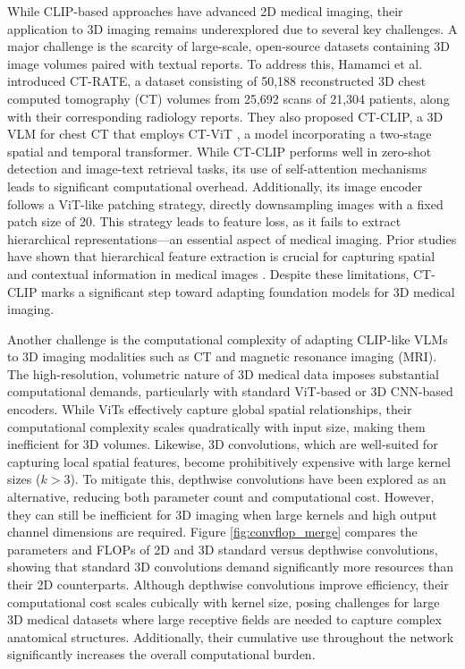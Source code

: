 While CLIP-based approaches have advanced 2D medical imaging, their application to 3D imaging remains underexplored due to several key challenges. A major challenge is the scarcity of large-scale, open-source datasets containing 3D image volumes paired with textual reports. To address this, Hamamci et al. \cite{hamamci2024foundation} introduced CT-RATE, a dataset consisting of 50,188 reconstructed 3D chest computed tomography (CT) volumes from 25,692 scans of 21,304 patients, along with their corresponding radiology reports. They also proposed CT-CLIP, a 3D VLM for chest CT that employs CT-ViT \cite{hamamci2025generatect}, a model incorporating a two-stage spatial and temporal transformer. While CT-CLIP performs well in zero-shot detection and image-text retrieval tasks, its use of self-attention mechanisms leads to significant computational overhead. Additionally, its image encoder follows a ViT-like patching strategy, directly downsampling images with a fixed patch size of 20. This strategy leads to feature loss, as it fails to extract hierarchical representations—an essential aspect of medical imaging. Prior studies have shown that hierarchical feature extraction is crucial for capturing spatial and contextual information in medical images \cite{chen2021transunet, cao2022swin, hatamizadeh2021swin}. Despite these limitations, CT-CLIP marks a significant step toward adapting foundation models for 3D medical imaging.

Another challenge is the computational complexity of adapting CLIP-like VLMs to 3D imaging modalities such as CT and magnetic resonance imaging (MRI). The high-resolution, volumetric nature of 3D medical data imposes substantial computational demands, particularly with standard ViT-based or 3D CNN-based encoders. While ViTs effectively capture global spatial relationships, their computational complexity scales quadratically with input size, making them inefficient for 3D volumes. Likewise, 3D convolutions, which are well-suited for capturing local spatial features, become prohibitively expensive with large kernel sizes ($k > 3$). To mitigate this, depthwise convolutions \cite{chollet2017xception} have been explored as an alternative, reducing both parameter count and computational cost. However, they can still be inefficient for 3D imaging when large kernels and high output channel dimensions are required. Figure \ref{fig:convflop_merge} compares the parameters and FLOPs of 2D and 3D standard versus depthwise convolutions, showing that standard 3D convolutions demand significantly more resources than their 2D counterparts. Although depthwise convolutions improve efficiency, their computational cost scales cubically with kernel size, posing challenges for large 3D medical datasets where large receptive fields are needed to capture complex anatomical structures. Additionally, their cumulative use throughout the network significantly increases the overall computational burden. 

